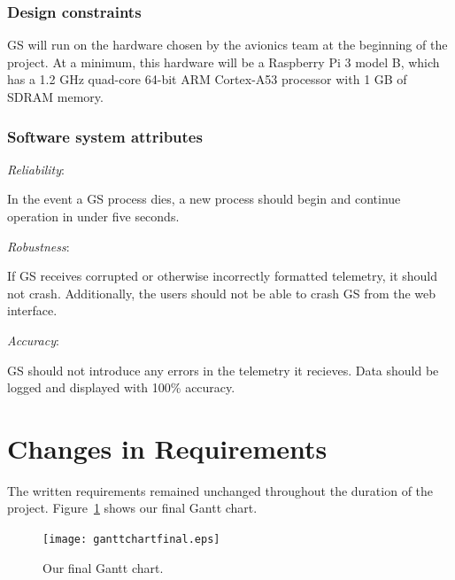 \documentclass[10pt,draftclsnofoot,onecolumn]{IEEEtran}
\newcommand{\subsubsubsection}[1]{
	\hfill\break\textit{#1}:
}
\begin{document}
	\subsubsection{Design constraints}
	GS will run on the hardware chosen by the avionics team at the beginning of the project.
	At a minimum, this hardware will be a Raspberry Pi 3 model B, which has a 1.2 GHz quad-core 64-bit ARM Cortex-A53 processor
	with 1 GB of SDRAM memory.

	\subsubsection{Software system attributes}

	\subsubsubsection{Reliability}
	In the event a GS process dies, a new process should begin and continue operation in under five seconds.

	\subsubsubsection{Robustness}
	If GS receives corrupted or otherwise incorrectly formatted telemetry, it should not crash.
	Additionally, the users should not be able to crash GS from the web interface.

	\subsubsubsection{Accuracy}
	GS should not introduce any errors in the telemetry it recieves.
	Data should be logged and displayed with 100\% accuracy.



































\newpage
\section{Changes in Requirements}
The written requirements remained unchanged throughout the duration of the project.
Figure~\ref{fig:ganttfinal} shows our final Gantt chart.
\hfill
\begin{figure}[h]
	\texttt{[image: ganttchartfinal.eps]}
	\caption{Our final Gantt chart.}
	\label{fig:ganttfinal}
\end{figure}
\end{document}
